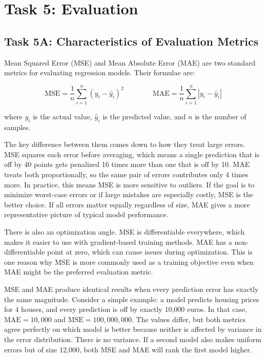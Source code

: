 \section{Task 5: Evaluation}

\subsection*{Task 5A: Characteristics of Evaluation Metrics}

Mean Squared Error (MSE) and Mean Absolute Error (MAE) are two standard metrics for evaluating regression models. Their formulae are:

\[
\text{MSE} = \frac{1}{n} \sum_{i=1}^{n} (y_i - \hat{y}_i)^2
\qquad\qquad
\text{MAE} = \frac{1}{n} \sum_{i=1}^{n} |y_i - \hat{y}_i|
\]

where $y_i$ is the actual value, $\hat{y}_i$ is the predicted value, and $n$ is the number of samples.

The key difference between them comes down to how they treat large errors. MSE squares each error before averaging, which means a single prediction that is off by 40 points gets penalized 16 times more than one that is off by 10. MAE treats both proportionally, so the same pair of errors contributes only 4 times more. In practice, this means MSE is more sensitive to outliers. If the goal is to minimize worst-case errors or if large mistakes are especially costly, MSE is the better choice. If all errors matter equally regardless of size, MAE gives a more representative picture of typical model performance.

There is also an optimization angle. MSE is differentiable everywhere, which makes it easier to use with gradient-based training methods. MAE has a non-differentiable point at zero, which can cause issues during optimization. This is one reason why MSE is more commonly used as a training objective even when MAE might be the preferred evaluation metric.

MSE and MAE produce identical results when every prediction error has exactly the same magnitude. Consider a simple example: a model predicts housing prices for 4 houses, and every prediction is off by exactly 10{,}000 euros. In that case, $\text{MAE} = 10{,}000$ and $\text{MSE} = 100{,}000{,}000$. The values differ, but both metrics agree perfectly on which model is better because neither is affected by variance in the error distribution. There is no variance. If a second model also makes uniform errors but of size 12{,}000, both MSE and MAE will rank the first model higher.

